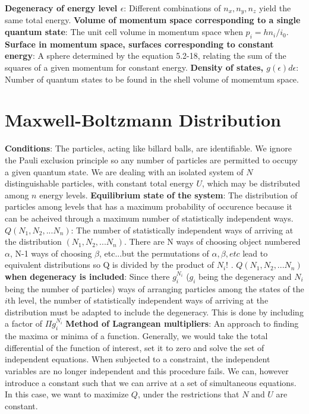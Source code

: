 \documentclass{article}
\numberwithin{equation}{section}
\begin{document}
\newline
\textbf{Degeneracy of energy level $\epsilon$}: Different combinations of $n_x, n_y, n_z$ yield the same total energy.
\newline
\textbf{Volume of momentum space corresponding to a single quantum state}: The unit cell volume in momentum space when $p_i=hn_i/i_0$.
\newline
\textbf{Surface in momentum space, surfaces corresponding to constant energy}: A sphere determined by the equation 5.2-18, relating the sum of the squares of a given momentum for constant energy. 
\newline
\textbf{Density of states, $g(\epsilon)d\epsilon$}: Number of quantum states to be found in the shell volume of momemtum space.
\newline
\section*{Maxwell-Boltzmann Distribution}
\textbf{Conditions}: The particles, acting like billard balls, are identifiable. We ignore the Pauli exclusion principle so any number of particles are permitted to occupy a given quantum state. We are dealing with an isolated system of $N$ distinguishable particles, with constant total energy $U$, which may be distributed among $n$ energy levels.
\newline
\textbf{Equilibrium state of the system}: The distribution of particles among levels that has a maximum probability of occurence because it can be acheived through a maximum number of statistically independent ways.
\newline
\textbf{$Q(N_1,N_2,...N_n)$}: The number of statistically independent ways of arriving at the distribution $(N_1,N_2,...N_n)$. There are N ways of choosing object numbered $\alpha$, N-1 ways of choosing $\beta$, etc...but the permutations of $\alpha, \beta, etc$ lead to equivalent distributions so Q is divided by the product of $N_i!$ . 
\newline
\textbf{$Q(N_1,N_2,...N_n)$ when degeneracy is included}: Since there $g_i^{N_i}$ ($g_i$ being the degeneracy and $N_i$ being the number of particles) ways of arranging particles among the states of the $i$th level, the number of statistically independent ways of arriving at the distribution must be adapted to include the degeneracy. This is done by including a factor of $\Pi g_i^{N_i}$
\newline
\textbf{Method of Lagrangean multipliers}: An approach to finding the maxima or minima of a function. Generally, we would take the total differential of the function of interest, set it to zero and solve the set of independent equations. When subjected to a constraint, the independent variables are no longer independent and this procedure fails.  We can, however introduce a constant such that we can arrive at a set of simultaneous equations. In this case, we want to maximize $Q$, under the restrictions that $N$ and $U$ are constant.
\end{document}
